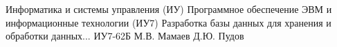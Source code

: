 \makecourseworktitle
{Информатика и системы управления (ИУ)}                %
{Программное обеспечение ЭВМ и информационные технологии (ИУ7)} %
{Разработка базы данных для хранения и обработки данных...}     %
{ИУ7-62Б}                                              %
{М.В. Мамаев}                                          %
{Д.Ю. Пудов}{}{}
